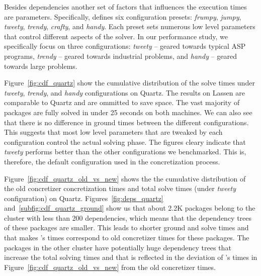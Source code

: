 




% 

Besides dependencies another set of factors that influences the execution times are \clingo{} parameters. Specifically, \clingo{} defines six configuration presets: \emph{frumpy}, \emph{jumpy}, \emph{tweety}, \emph{trendy}, \emph{crafty}, and \emph{handy}. Each preset sets numerous low level parameters that control different aspects of the solver. In our performance study, we specifically focus on three configurations: \emph{tweety} -- geared towards typical ASP programs, \emph{trendy} -- geared towards industrial problems, and \emph{handy} -- geared towards large problems.

Figure~\ref{fig:cdf_quartz} show the cumulative distribution of the solve times under \emph{tweety}, \emph{trendy}, and \emph{handy} configurations on Quartz. The results on Lassen are comparable to Quartz and are ommitted to save space. The vast majority of packages are fully solved in under 25 seconds on both machines. We can also see that there is no difference in ground times between the different configurations. This suggests that most low level parameters that are tweaked by each configuration control the actual solving phase. The figures cleary indicate that \emph{tweety} performs better than the other configurations we benchmarked. This is, therefore, the default configuration used in the concretization process.

Figure~\ref{fig:cdf_quartz_old_vs_new} shows the the cumulative distribution of the old concretizer concretization times and \clingo{} total solve times (under \emph{tweety} configuration) on Quartz. Figures~\ref{fig:deps_quartz} and~\ref{subfig:cdf_quartz_ground} show us that about 2.2K packages belong to the cluster with less than 200 dependencies, which means that the dependency trees of these packages are smaller. This leads to shorter ground and solve times and that makes \clingo{}'s times correspond to old concretizer times for these packages. The packages in the other cluster have potentially huge dependency trees that increase the total solving times and that is reflected in the deviation of \clingo{}'s times in Figure~\ref{fig:cdf_quartz_old_vs_new} from the old concretizer times.


